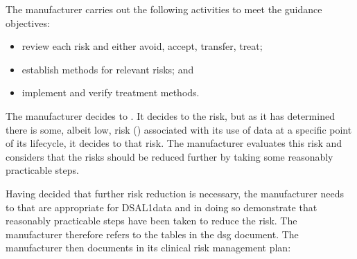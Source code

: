 \begin{minipage}[t]{0.73\textwidth}
  The manufacturer carries out the following activities to meet the guidance objectives:
  \begin{itemize}
    \item review each risk and either avoid, accept, transfer, \gls{treat};
    \item establish  methods for relevant risks; and
    \item implement and verify \gls{treatment} methods.
  \end{itemize}
\end{minipage}
\begin{minipage}[t]{0.25\textwidth}
  \centering{}
\end{minipage}

The manufacturer decides to . It decides to  the  risk, but as it has determined there is some, albeit low, risk () associated with its use of data at a specific point of its lifecycle, it decides to  that risk. The manufacturer evaluates this risk and considers that the risks should be reduced further by taking some reasonably practicable steps.

Having decided that further risk reduction is necessary, the manufacturer needs to  that are appropriate for DSAL1data and in doing so demonstrate that reasonably practicable steps have been taken to reduce the risk. The manufacturer therefore refers to the tables in the \gls{dsg} document. The manufacturer then documents in its clinical risk management plan:

